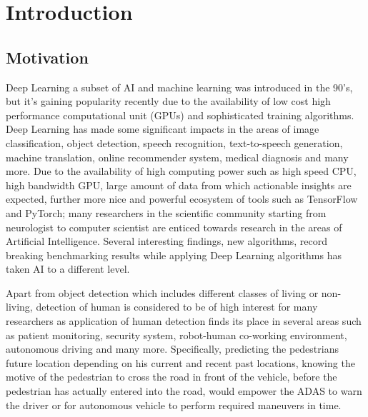\pagestyle{fancy}
\fancyhf{}
\fancyhead[EL]{\leftmark} %
\fancyhead[OL]{\leftmark}
\fancyhead[ER,OR]{\thepage}

\setcounter{page}{1}

\chapter{Introduction}
\section{Motivation}
Deep Learning a subset of AI and machine learning was introduced in the 90's, but it's gaining  popularity recently due to the availability of low cost high performance computational unit (GPUs) and sophisticated training algorithms. Deep Learning has made some significant impacts in the areas of image classification, 
object detection, speech recognition, text-to-speech generation, machine translation,
online recommender system, medical diagnosis and many more. Due to the availability of high 
computing power such as high speed CPU, high bandwidth GPU, large amount of 
data from which actionable insights are expected, further more nice and powerful ecosystem of  
tools such as TensorFlow and PyTorch; many researchers in the scientific community 
starting from neurologist to computer scientist are enticed towards research in the areas 
of Artificial Intelligence. Several interesting findings, new algorithms, record 
breaking benchmarking results while applying Deep Learning algorithms has taken 
AI to a different level.

\newpara Apart from object detection which includes different classes of living or non-living, detection of human is considered to be of high interest for many researchers as application of human detection finds its place in several areas such as patient monitoring, security system, robot-human co-working environment, autonomous driving and many more. Specifically, predicting the pedestrians future 
location depending on his current and recent past locations, knowing the motive of the pedestrian to cross the road in front of the vehicle, before the pedestrian has actually entered into the road, would empower the ADAS to warn the driver or for autonomous vehicle to perform required maneuvers in time.

